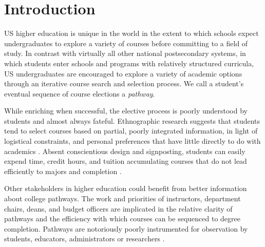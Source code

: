 \section{Introduction}



US higher education is unique in the world in the extent to
which schools expect undergraduates to explore a variety of courses before committing to a field of study. In contrast with virtually all other national postsecondary systems, in which students enter schools and programs with relatively structured curricula, US undergraduates are encouraged to explore a variety of academic options through an
iterative course search and selection process. We call a student's
eventual sequence of course elections a {\it pathway}.

While enriching when successful, the elective process is poorly understood by students and almost always fateful. Ethnographic research suggests that students tend to select courses based on partial, poorly integrated information, in light of logistical constraints, and personal preferences that have little directly to do with academics \cite{nathan2006my,rosenbaum2011complexities, rosenbaum2007after}. Absent conscientious design and signposting, students can easily expend time, credit hours, and tuition accumulating courses that do not lead efficiently to majors and completion \cite{bailey2015redesigning}.  

Other stakeholders in higher education could benefit from better information about college pathways. The work and priorities of instructors, department chairs, deans, and budget officers are implicated in the relative clarity of pathways and the efficiency with which courses can be sequenced to degree completion. Pathways are notoriously poorly instrumented for observation by students, educators, administrators or researchers \cite{chambliss2014college}.



